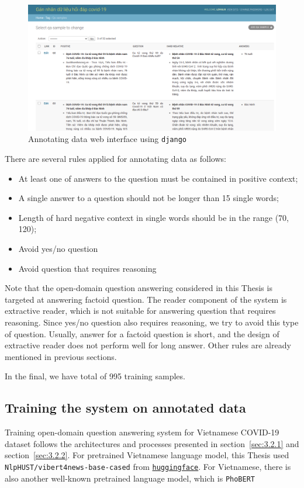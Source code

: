 \documentclass[12pt, sort&compress]{report}
\begin{document}
\begin{figure}[!htbp]
	\centering
	\includegraphics[scale=.3]{images/annotate.png}
	\caption{Annotating data web interface using {\tt django}}
	\label{fig:10}
\end{figure}
There are several rules applied for annotating data as follows:
\begin{itemize}
	\item At least one of answers to the question must be contained in positive context;
	\item A single answer to a question should not be longer than 15 single words;
	\item Length of hard negative context in single words should be in the range (70, 120);
	\item Avoid yes/no question
	\item Avoid question that requires reasoning
\end{itemize}
Note that the open-domain question answering considered in this Thesis is targeted at answering factoid question. The reader component of the system is extractive reader, which is not suitable for answering question that requires reasoning. Since yes/no question also requires reasoning, we try to avoid this type of question. Usually, answer for a factoid question is short, and the design of extractive reader does not perform well for long answer. Other rules are already mentioned in previous sections.
\par In the final, we have total of 995 training samples. 
\subsection{Training the system on annotated data}
\label{sec:3.3.3}
Training open-domain question answering system for Vietnamese COVID-19 dataset follows the architectures and processes presented in section~\ref{sec:3.2.1} and section~\ref{sec:3.2.2}. For pretrained Vietnamese language model, this Thesis used {\tt NlpHUST/vibert4news-base-cased} from \href{https://huggingface.co/}{\tt huggingface}. For Vietnamese, there is also another well-known pretrained language model, which is {\tt PhoBERT} \cite{nguyen2020phobert}
\end{document}
